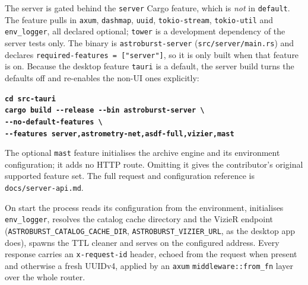 \documentclass[11pt,a4paper]{article}
\newcommand{\code}[1]{\texttt{\small #1}}
\newcommand{\crate}[1]{\texttt{#1}}
\newcommand{\cmd}[1]{\texttt{\bfseries #1}}
\begin{document}
    The server is gated behind the \code{server} Cargo feature, which is \emph{not} in \code{default}. The feature pulls in \crate{axum}, \crate{dashmap}, \crate{uuid}, \crate{tokio-stream}, \crate{tokio-util} and \crate{env\_logger}, all declared optional; \crate{tower} is a development dependency of the server tests only. The binary is \code{astroburst-server} (\code{src/server/main.rs}) and declares \code{required-features = ["server"]}, so it is only built when that feature is on. Because the desktop feature \code{tauri} is a default, the server build turns the defaults off and re-enables the non-UI ones explicitly:

    \begin{infobox}[Build]
        \cmd{cd src-tauri}\\
        \cmd{cargo build -{}-release -{}-bin astroburst-server \textbackslash}\\
        \cmd{\hspace*{2em}-{}-no-default-features \textbackslash}\\
        \cmd{\hspace*{2em}-{}-features server,astrometry-net,asdf-full,vizier,mast}
    \end{infobox}

    The optional \code{mast} feature initialises the archive engine and its environment configuration; it adds no HTTP route. Omitting it gives the contributor's original supported feature set. The full request and configuration reference is \code{docs/server-api.md}.

    On start the process reads its configuration from the environment, initialises \crate{env\_logger}, resolves the catalog cache directory and the VizieR endpoint (\code{ASTROBURST\_CATALOG\_CACHE\_DIR}, \code{ASTROBURST\_VIZIER\_URL}, as the desktop app does), spawns the TTL cleaner and serves on the configured address. Every response carries an \code{x-request-id} header, echoed from the request when present and otherwise a fresh UUIDv4, applied by an \crate{axum} \code{middleware::from\_fn} layer over the whole router.
\end{document}
